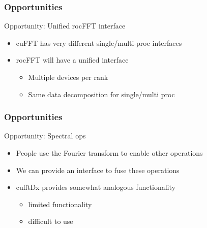 \documentclass[10pt,aspectratio=169]{beamer}
\begin{document}
\begin{frame}
  \frametitle{Opportunities}

  \begin{center}
    Opportunity: Unified rocFFT interface
  \end{center}
  \begin{itemize}
  \item cuFFT has very different single/multi-proc interfaces
  \item rocFFT will have a unified interface
    \begin{itemize}
    \item Multiple devices per rank
    \item Same data decomposition for single/multi proc
    \end{itemize}
  \end{itemize}

  
\end{frame}
  
\begin{frame}
  \frametitle{Opportunities}

  \begin{center}
    Opportunity: Spectral ops
  \end{center}
  \begin{itemize}
  \item People use the Fourier transform to enable other operations
  \item We can provide an interface to fuse these operations
  \item cufftDx provides somewhat analogous functionality
    \begin{itemize}
    \item limited functionality
    \item difficult to use
    \end{itemize}
  \end{itemize}

 
\end{frame}
  
\end{document}
